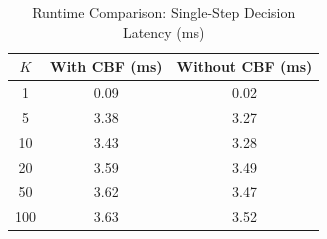 \begin{table}[htbp]
\centering
\caption{Runtime Comparison: Single-Step Decision Latency (ms)}
\label{tab:runtime}
\begin{tabular}{c|cc}
\toprule
$K$ & With CBF (ms) & Without CBF (ms) \\
\midrule
  1 & 0.09 & 0.02 \\
  5 & 3.38 & 3.27 \\
  10 & 3.43 & 3.28 \\
  20 & 3.59 & 3.49 \\
  50 & 3.62 & 3.47 \\
  100 & 3.63 & 3.52 \\
\bottomrule
\end{tabular}
\end{table}
